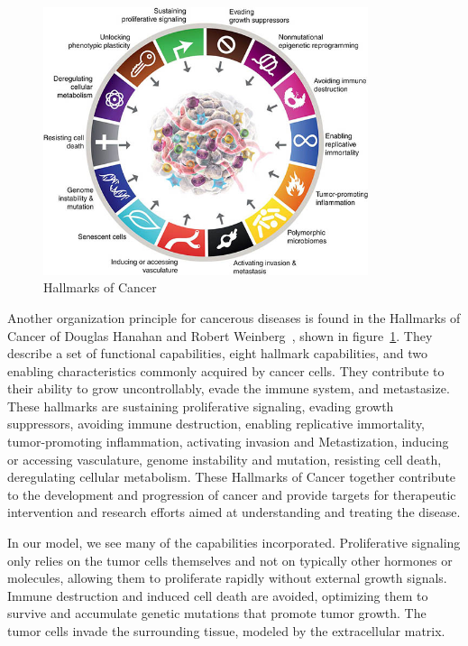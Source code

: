 \begin{figure}[h]
    \centering
    \includegraphics[width=0.85\textwidth]{resources/images/Hallmarks-of-Cancer.jpg}
    \caption{Hallmarks of Cancer}
    \label{fig:hallmarks_of_cancer}
\end{figure}
Another organization principle for cancerous diseases is found in the Hallmarks of Cancer of Douglas Hanahan and Robert Weinberg~\cite{10.1158/2159-8290.CD-21-1059}, shown in figure~\ref{fig:hallmarks_of_cancer}. They describe a set of functional capabilities, eight hallmark capabilities, and two enabling characteristics commonly acquired by cancer cells. They contribute to their ability to grow uncontrollably, evade the immune system, and metastasize. These hallmarks are sustaining proliferative signaling, evading growth suppressors, avoiding immune destruction, enabling replicative immortality, tumor-promoting inflammation, activating invasion and Metastization, inducing or accessing vasculature, genome instability and mutation, resisting cell death, deregulating cellular metabolism. These Hallmarks of Cancer together contribute to the development and progression of cancer and provide targets for therapeutic intervention and research efforts aimed at understanding and treating the disease. 

In our model, we see many of the capabilities incorporated. Proliferative signaling only relies on the tumor cells themselves and not on typically other hormones or molecules, allowing them to proliferate rapidly without external growth signals. Immune destruction and induced cell death are avoided, optimizing them to survive and accumulate genetic mutations that promote tumor growth. The tumor cells invade the surrounding tissue, modeled by the extracellular matrix.

